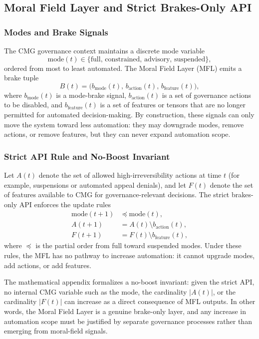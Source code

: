 \documentclass[11pt]{article}
\begin{document}
\subsection{Moral Field Layer and Strict Brakes-Only API}

\subsubsection{Modes and Brake Signals}

The CMG governance context maintains a discrete mode variable
\[
\mathrm{mode}(t) \in \{\text{full},\, \text{constrained},\, \text{advisory},\, \text{suspended}\},
\]
ordered from most to least automated. The Moral Field Layer (MFL) emits a brake tuple
\[
B(t) = \bigl(b_{\mathrm{mode}}(t),\, b_{\mathrm{action}}(t),\, b_{\mathrm{feature}}(t)\bigr),
\]
where \(b_{\mathrm{mode}}(t)\) is a mode-brake signal, \(b_{\mathrm{action}}(t)\) is a set of governance actions to be disabled, and \(b_{\mathrm{feature}}(t)\) is a set of features or tensors that are no longer permitted for automated decision-making. By construction, these signals can only move the system toward less automation: they may downgrade modes, remove actions, or remove features, but they can never expand automation scope.

\subsubsection{Strict API Rule and No-Boost Invariant}

Let \(A(t)\) denote the set of allowed high-irreversibility actions at time \(t\) (for example, suspensions or automated appeal denials), and let \(F(t)\) denote the set of features available to CMG for governance-relevant decisions. The strict brakes-only API enforces the update rules
\begin{align*}
\mathrm{mode}(t+1) &\preceq \mathrm{mode}(t), \\
A(t+1) &= A(t) \setminus b_{\mathrm{action}}(t), \\
F(t+1) &= F(t) \setminus b_{\mathrm{feature}}(t),
\end{align*}
where \(\preceq\) is the partial order from full toward suspended modes. Under these rules, the MFL has no pathway to increase automation: it cannot upgrade modes, add actions, or add features.

The mathematical appendix formalizes a no-boost invariant: given the strict API, no internal CMG variable such as the mode, the cardinality \(|A(t)|\), or the cardinality \(|F(t)|\) can increase as a direct consequence of MFL outputs. In other words, the Moral Field Layer is a genuine brake-only layer, and any increase in automation scope must be justified by separate governance processes rather than emerging from moral-field signals.
\end{document}
